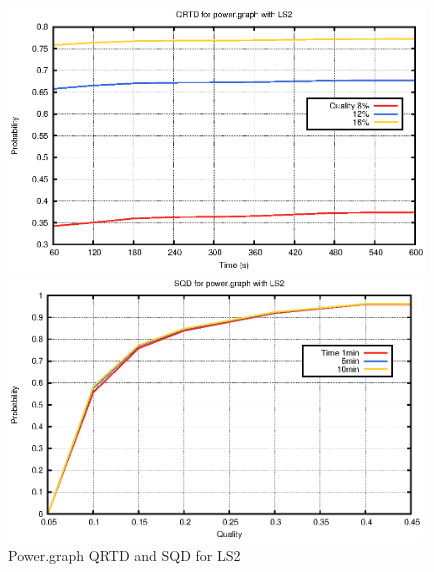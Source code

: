 \begin{figure}[H]
\centering
\caption{Power.graph QRTD and SQD for LS2}
\begin{minipage}[b]{0.4\textwidth}
\includegraphics[height=7cm]{../graph/power-QRTD-LS2.eps}
\end{minipage}
\hspace{0.6in}
\begin{minipage}[b]{0.4\textwidth}
\centering
\includegraphics[height=7cm]{../graph/power-SQD-LS2.eps}
\end{minipage}
\end{figure}

